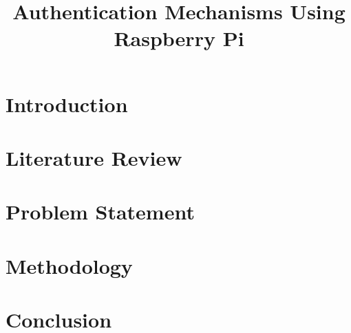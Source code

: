 \documentclass[a4paper, 11pt]{article}
\begin{document}
\title{Authentication Mechanisms Using Raspberry Pi}

\maketitle

\begin{abstract}
\end{abstract}

\section{Introduction}

\section{Literature Review}


\section{Problem Statement}


\section{Methodology}

\section{Conclusion}



\end{document}
